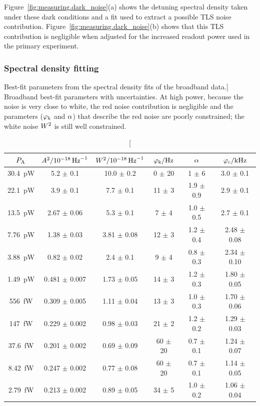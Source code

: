 Figure~\ref{fig:measuring.dark_noise}(a) shows the detuning spectral density taken under these dark conditions and a fit used to extract a possible TLS noise contribution.
Figure~\ref{fig:measuring.dark_noise}(b) shows that this TLS contribution is negligible when adjusted for the increased readout power used in the primary experiment.


\subsubsection{Spectral density fitting}

\begin{table}[htb]
\centering
\caption
[Best-fit parameters from the spectral density fits of the broadband data.]
{Broadband best-fit parameters with uncertainties.
At high power, because the noise is very close to white, the red noise contribution is negligible and the parameters ($\faudio_\knee$ and $\spectralindex$) that describe the red noise are poorly constrained; the white noise $\detectorwhite^2$ is still well constrained.}
\renewcommand{\arraystretch}{1.2}
\begin{tabular}{cccccc}
\toprule
$\power_\absorbed$ & $\amplifierwhite^2 / \SI{e-18}{Hz^{-1}}$ & $\detectorwhite^2 / \SI{e-18}{Hz^{-1}}$ & $\faudio_\knee / \si{Hz}$ & $\spectralindex$ & $\faudio_\cutoff / \si{kHz}$ \\
\midrule
\SI{30.4}{pW} & 5.2 $\pm$ 0.1 & 10.0 $\pm$ 0.2 & 0 $\pm$ 20 & 1 $\pm$ 6 & 3.0 $\pm$ 0.1 \\
\SI{22.1}{pW} & 3.9 $\pm$ 0.1 & 7.7 $\pm$ 0.1 & 11 $\pm$ 3 & 1.9 $\pm$ 0.9 & 2.9 $\pm$ 0.1 \\
\SI{13.5}{pW} & 2.67 $\pm$ 0.06 & 5.3 $\pm$ 0.1 & 7 $\pm$ 4 & 1.0 $\pm$ 0.5 & 2.7 $\pm$ 0.1 \\
\SI{7.76}{pW} & 1.38 $\pm$ 0.03 & 3.81 $\pm$ 0.08 & 12 $\pm$ 3 & 1.2 $\pm$ 0.4 & 2.48 $\pm$ 0.08 \\
\SI{3.88}{pW} & 0.82 $\pm$ 0.02 & 2.4 $\pm$ 0.1 & 9 $\pm$ 4 & 0.8 $\pm$ 0.3 & 2.34 $\pm$ 0.10 \\
\SI{1.49}{pW} & 0.481 $\pm$ 0.007 & 1.73 $\pm$ 0.05 & 14 $\pm$ 3 & 1.2 $\pm$ 0.3 & 1.80 $\pm$ 0.05 \\
\SI{556}{fW} & 0.309 $\pm$ 0.005 & 1.11 $\pm$ 0.04 & 13 $\pm$ 3 & 1.0 $\pm$ 0.3 & 1.70 $\pm$ 0.06 \\
\SI{147}{fW} & 0.229 $\pm$ 0.002 & 0.98 $\pm$ 0.03 & 21 $\pm$ 2 & 1.2 $\pm$ 0.2 & 1.29 $\pm$ 0.03 \\
\SI{37.6}{fW} & 0.201 $\pm$ 0.002 & 0.69 $\pm$ 0.09 & 60 $\pm$ 20 & 0.7 $\pm$ 0.1 & 1.24 $\pm$ 0.07 \\
\SI{8.42}{fW} & 0.247 $\pm$ 0.002 & 0.77 $\pm$ 0.08 & 60 $\pm$ 20 & 0.7 $\pm$ 0.1 & 1.14 $\pm$ 0.05 \\
\SI{2.79}{fW} & 0.213 $\pm$ 0.002 & 0.89 $\pm$ 0.05 & 34 $\pm$ 5 & 1.0 $\pm$ 0.2 & 1.06 $\pm$ 0.04 \\
\bottomrule
\end{tabular}
\label{tab:bbfitparams}
\end{table}

